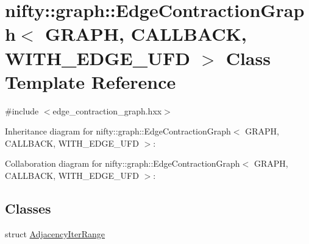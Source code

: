 \hypertarget{classnifty_1_1graph_1_1EdgeContractionGraph}{}\section{nifty\+:\+:graph\+:\+:Edge\+Contraction\+Graph$<$ G\+R\+A\+P\+H, C\+A\+L\+L\+B\+A\+C\+K, W\+I\+T\+H\+\_\+\+E\+D\+G\+E\+\_\+\+U\+F\+D $>$ Class Template Reference}
\label{classnifty_1_1graph_1_1EdgeContractionGraph}


{\ttfamily \#include $<$edge\+\_\+contraction\+\_\+graph.\+hxx$>$}



Inheritance diagram for nifty\+:\+:graph\+:\+:Edge\+Contraction\+Graph$<$ G\+R\+A\+P\+H, C\+A\+L\+L\+B\+A\+C\+K, W\+I\+T\+H\+\_\+\+E\+D\+G\+E\+\_\+\+U\+F\+D $>$\+:


Collaboration diagram for nifty\+:\+:graph\+:\+:Edge\+Contraction\+Graph$<$ G\+R\+A\+P\+H, C\+A\+L\+L\+B\+A\+C\+K, W\+I\+T\+H\+\_\+\+E\+D\+G\+E\+\_\+\+U\+F\+D $>$\+:
\subsection*{Classes}
\begin{DoxyCompactItemize}
\item 
struct \hyperlink{structnifty_1_1graph_1_1EdgeContractionGraph_1_1AdjacencyIterRange}{Adjacency\+Iter\+Range}
\end{DoxyCompactItemize}
